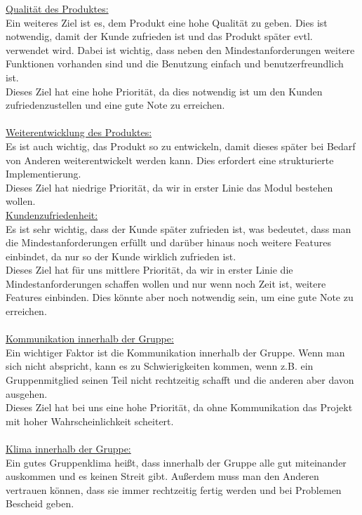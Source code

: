 \documentclass[fontsize=12pt,paper=a4,twoside]{scrartcl}
\begin{document}
\underline{Qualität des Produktes:} \\
Ein weiteres Ziel ist es, dem Produkt eine hohe Qualität zu geben. Dies ist notwendig, damit der Kunde zufrieden ist und das Produkt später evtl. verwendet wird. Dabei ist wichtig, dass neben den Mindestanforderungen weitere Funktionen vorhanden sind und die Benutzung einfach und benutzerfreundlich ist.\\
Dieses Ziel hat eine hohe Priorität, da dies notwendig ist um den Kunden zufriedenzustellen und eine gute Note zu erreichen.\\
\bigskip \\
\underline{Weiterentwicklung des Produktes:} \\
Es ist auch wichtig, das Produkt so zu entwickeln, damit dieses später bei Bedarf von Anderen weiterentwickelt werden kann. Dies erfordert eine strukturierte Implementierung.\\
Dieses Ziel hat niedrige Priorität, da wir in erster Linie das Modul bestehen wollen.
\bigskip \\
\underline{Kundenzufriedenheit:}\\
Es ist sehr wichtig, dass der Kunde später zufrieden ist, was bedeutet, dass man die Mindestanforderungen erfüllt und darüber hinaus noch weitere Features einbindet, da nur so der Kunde wirklich zufrieden ist. \\
Dieses Ziel hat für uns mittlere Priorität, da wir in erster Linie die Mindestanforderungen schaffen wollen und nur wenn noch Zeit ist, weitere Features einbinden. Dies könnte aber noch notwendig sein, um eine gute Note zu erreichen.\\
\bigskip \\
\underline{Kommunikation innerhalb der Gruppe:} \\
Ein wichtiger Faktor ist die Kommunikation innerhalb der Gruppe. Wenn man sich nicht abspricht, kann es zu Schwierigkeiten kommen, wenn z.B. ein Gruppenmitglied seinen Teil nicht rechtzeitig schafft und die anderen aber davon ausgehen.\\
Dieses Ziel hat bei uns eine hohe Priorität, da ohne Kommunikation das Projekt mit hoher Wahrscheinlichkeit scheitert.\\
\bigskip \\
\underline{Klima innerhalb der Gruppe:} \\
Ein gutes Gruppenklima heißt, dass innerhalb der Gruppe alle gut miteinander auskommen und es keinen Streit gibt. Außerdem muss man den Anderen vertrauen können, dass sie immer rechtzeitig fertig werden und bei Problemen Bescheid geben.\\
\end{document}
